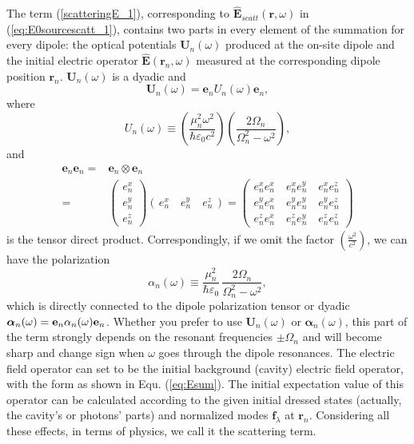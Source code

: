 The term (\ref{scatteringE_1}), corresponding to $\mathbf{\hat{E}}_{scatt}(\mathbf{r},\omega)$ in (\ref{eq:E0sourcescatt_1}), contains two parts in every element of the summation for every dipole:
the optical potentials $\mathbf{U}_n(\omega)$ produced at the on-site dipole
and the initial electric operator $\mathbf{\hat{E}}(\mathbf{r}_n,\omega)$ measured at the corresponding dipole position $\mathbf{r}_n$.
$\mathbf{U}_n(\omega)$ is a dyadic and
\begin{equation}
 \label{Udyadic}
\mathbf{U}_n(\omega)=\mathbf{e}_nU_n(\omega)\mathbf{e}_n,
\end{equation}
 where
\begin{equation}
 \label{Un}
 U_n(\omega) \equiv \left(\frac{\mu_n^2\omega^2}{\hbar\varepsilon_0c^2}\right)
\left(\frac{2\Omega_n}{\Omega_n^2-\omega^2}\right),
\end{equation}
and
\begin{subequations}\label{directproduct}
\begin{align}
\mathbf{e}_n\mathbf{e}_n=& \mathbf{e}_n \otimes \mathbf{e}_n\\
=& \left( \! \begin{array}{cc}
    e_n^x \\ e_n^y \\ e_n^z
   \end{array} \! \right)
\left(\, e_n^x\quad e_n^y \quad e_n^z \, \right)=\left( \! \begin{array}{c}
                                  e_n^xe_n^x\quad  e_n^xe_n^y\quad  e_n^xe_n^z\\
                                  e_n^ye_n^x\quad  e_n^ye_n^y\quad  e_n^ye_n^z \\
                                  e_n^ze_n^x\quad  e_n^ze_n^y\quad e_n^ze_n^z
                                 \end{array} \! \right)
\end{align}
\end{subequations}
is the tensor direct product.
Correspondingly, if we omit the factor $(\frac{\omega^2}{c^2})$, we can have the polarization
\begin{equation}
 \label{alpha}
 \alpha_n(\omega) \equiv \frac{\mu_n^2}{\hbar\varepsilon_0}\,\frac{2\Omega_n}{\Omega_n^2-\omega^2},
\end{equation}
which is directly connected to the dipole polarization tensor or dyadic
${\bm \alpha}_n(\omega) = {\bf e}_n \alpha_n(\omega){\bf e}_n$. Whether you prefer to use $\mathbf{U}_n(\omega)$ or ${\bm \alpha}_n(\omega)$,
this part of the term strongly depends on the resonant frequencies $\pm\Omega_n$ and will become sharp and change sign when $\omega$ goes through the dipole resonances.
The electric field operator can set to be the initial background (cavity) electric field operator, with the form as shown in Equ. (\ref{eq:Esum}).
The initial expectation value of this operator can be calculated
according to the given initial dressed states (actually, the cavity's or photons' parts) and normalized modes $\mathbf{f}_\lambda$ at $\mathbf{r}_n$.
Considering all these effects, in terms of physics, we call it the scattering term.



